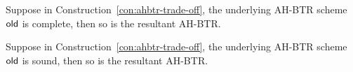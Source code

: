\begin{theorem}\label{thm:ahbtr-trade-off-completeness}
Suppose in Construction~\ref{con:ahbtr-trade-off},
the underlying AH-BTR scheme $\OLD$ is complete,
then so is the resultant AH-BTR\@.
\end{theorem}

\begin{theorem}\label{thm:ahbtr-trade-off-soundness}
Suppose in Construction~\ref{con:ahbtr-trade-off},
the underlying AH-BTR scheme $\OLD$ is sound,
then so is the resultant AH-BTR\@.
\end{theorem}
